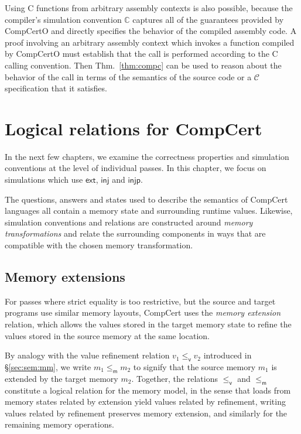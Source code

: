 \documentclass[draft,11pt]{report}
\newcommand{\kw}[1]{\ensuremath{ \mathsf{#1} }}
\newcommand{\vref}{\le_\kw{v}}   %
\newcommand{\mext}{\le_\kw{m}}   %
\begin{document}
Using C functions from
arbitrary assembly contexts is also possible,
because the compiler's simulation convention $\mathbb{C}$
captures all of the guarantees provided by CompCertO and
directly specifies the behavior of the compiled assembly code.
A proof involving an arbitrary assembly context
which invokes a function compiled by CompCertO
must establish that the call is performed
according to the C calling convention.
Then Thm.~\ref{thm:compc}
can be used to reason about the behavior of the call
in terms of the semantics of the source code
or a $\mathcal{C}$ specification that it satisfies.




\chapter{Logical relations for CompCert} \label{sec:cklr} %

In the next few chapters,
we examine the correctness properties
and simulation conventions
at the level of individual passes.
In this chapter,
we focus on simulations which use
$\kw{ext}$, $\kw{inj}$ and $\kw{injp}$.

The questions, answers and states
used to describe the semantics of CompCert languages all contain
a memory state and surrounding runtime values.
Likewise, simulation conventions and relations
are constructed around \emph{memory transformations}
and relate the surrounding components in ways that %
are compatible with the chosen memory transformation.

\section{Memory extensions} \label{sec:memext} %

For passes where strict equality is too restrictive,
but the source and target programs
use similar memory layouts,
CompCert uses the \emph{memory extension} relation,
which allows the values
stored in the target memory state to refine
the values stored in the source memory at the same location.

By analogy with
the value refinement relation $v_1 \vref v_2$
introduced in \S\ref{sec:sem:mm},
we write $m_1 \mext m_2$ to signify that
the source memory $m_1$ is extended by
the target memory $m_2$.
Together,
the relations $\vref$ and $\mext$
constitute a logical relation for the memory model,
in the sense that
loads from memory states related by extension
yield values related by refinement,
writing values related by refinement
preserves memory extension,
and similarly for the remaining memory operations.
\end{document}
